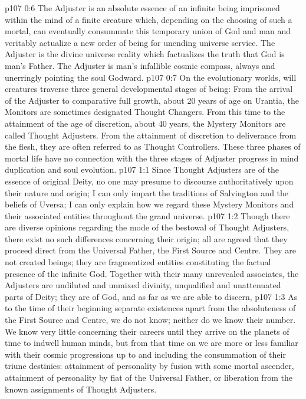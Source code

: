 \vs p107 0:6 The Adjuster is an absolute essence of an infinite being imprisoned within the mind of a finite creature which, depending on the choosing of such a mortal, can eventually consummate this temporary union of God and man and veritably actualize a new order of being for unending universe service. The Adjuster is the divine universe reality which factualizes the truth that God is man’s Father. The Adjuster is man’s infallible cosmic compass, always and unerringly pointing the soul Godward.
\vs p107 0:7 \pc On the evolutionary worlds, will creatures traverse three general developmental stages of being: From the arrival of the Adjuster to comparative full growth, about 20 years of age on Urantia, the Monitors are sometimes designated Thought Changers. From this time to the attainment of the age of discretion, about 40 years, the Mystery Monitors are called Thought Adjusters. From the attainment of discretion to deliverance from the flesh, they are often referred to as Thought Controllers. These three phases of mortal life have no connection with the three stages of Adjuster progress in mind duplication and soul evolution.
\vs p107 1:1 Since Thought Adjusters are of the essence of original Deity, no one may presume to discourse authoritatively upon their nature and origin; I can only impart the traditions of Salvington and the beliefs of Uversa; I can only explain how we regard these Mystery Monitors and their associated entities throughout the grand universe.
\vs p107 1:2 Though there are diverse opinions regarding the mode of the bestowal of Thought Adjusters, there exist no such differences concerning their origin; all are agreed that they proceed direct from the Universal Father, the First Source and Centre. They are not created beings; they are fragmentized entities constituting the factual presence of the infinite God. Together with their many unrevealed associates, the Adjusters are undiluted and unmixed divinity, unqualified and unattenuated parts of Deity; they are of God, and as far as we are able to discern, 
\vs p107 1:3 As to the time of their beginning separate existences apart from the absoluteness of the First Source and Centre, we do not know; neither do we know their number. We know very little concerning their careers until they arrive on the planets of time to indwell human minds, but from that time on we are more or less familiar with their cosmic progressions up to and including the consummation of their triune destinies: attainment of personality by fusion with some mortal ascender, attainment of personality by fiat of the Universal Father, or liberation from the known assignments of Thought Adjusters.
